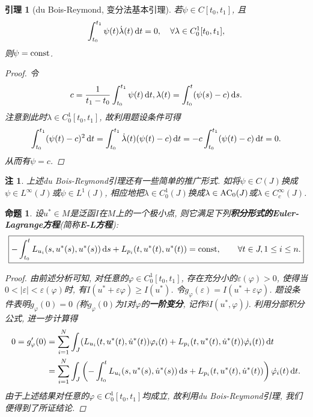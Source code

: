 \documentclass[12pt,a4paper]{article}
\newtheorem{proposition}[theorem]{命题}
\newtheorem{lemma}[theorem]{引理}
\newtheorem{remark}[theorem]{注}
\begin{document}
\begin{lemma}[du Bois-Reymond, 变分法基本引理]
    若$\psi \in C[t_0, t_1]$, 且
    \begin{equation*}
        \int_{t_0}^{t_1} \psi(t)\dot{\lambda}(t) \,{\rm d}t = 0, \quad \forall \lambda \in C_0^1[t_0, t_1],
    \end{equation*}
    则$\psi = {\rm const}$.
    \begin{proof}
        令
        \begin{equation*}
            c = \frac{1}{t_1 - t_0}\int_{t_0}^{t_1}\psi(t) \,{\rm d}t, \lambda(t) = \int_{t_0}^t(\psi(s) - c) \,{\rm d}s.
        \end{equation*}
        注意到此时$\lambda \in C_0^1[t_0, t_1]$, 故利用题设条件可得 
        \begin{equation*}
            \int_{t_0}^{t_1}(\psi(t) - c)^2 \,{\rm d}t = \int_{t_0}^{t_1}\dot{\lambda}(t)(\psi(t) - c) \,{\rm d}t = -c\int_{t_0}^{t_1}(\psi(t) - c) \,{\rm d}t = 0.
        \end{equation*}
        从而有$\psi = c$.
    \end{proof}
\end{lemma}

\begin{remark}
    上述du Bois-Reymond引理还有一些简单的推广形式. 如将$\psi \in C(J)$换成$\psi \in L^{\infty}(J)$或$\psi \in L^1(J)$, 相应地把$\lambda \in C_0^1(J)$换成$\lambda \in {\rm AC_0}(J)$或$\lambda \in C_c^{\infty}(J)$.
\end{remark}

\begin{proposition}
    设$u^* \in M$是泛函$I$在$M$上的一个极小点, 则它满足下列\textbf{积分形式的Euler-Lagrange方程}(简称\textbf{E-L方程}):
    \begin{equation*}
        \boxed{-\int_{t_0}^tL_{u_i}(s, u^*(s) , u^*(s)) \,{\rm d}s + L_{p_i}(t, u^*(t) , u^*(t)) = {\rm const}, \qquad \forall t \in J, 1 \leq i \leq n.}
    \end{equation*}
    \begin{proof}
        由前述分析可知, 对任意的$\varphi \in C_0^1[t_0, t_1]$, 存在充分小的$\varepsilon(\varphi) > 0$, 使得当$0 < |\varepsilon| < \varepsilon(\varphi)$时, 有$I(u^* + \varepsilon\varphi) \geq I(u^*)$.
        令$g_{\varphi}(\varepsilon) = I(u^* + \varepsilon\varphi)$. 题设条件表明$\dot g_{\varphi}(0) = 0$ (称$\dot g_{\varphi}(0)$为$I$对$\varphi$的\textbf{一阶变分}, 记作$\delta I(u^*, \varphi)$).
        利用分部积分公式, 进一步计算得
        \begin{align*}
            0 = g_{\varphi}'(0) &= \sum\limits_{i = 1}^N\int_J(L_{u_i}(t, u^*(t) , \dot u^*(t))\varphi_i(t) + L_{p_i}(t, u^*(t) , \dot u^*(t))\dot{\varphi_i}(t)) \,{\rm d}t \\  
            &= \sum\limits_{i = 1}^N\int_J\left(-\int_{t_0}^tL_{u_i}(s, u^*(s) , \dot u^*(s)) \,{\rm d}s + L_{p_i}(t, u^*(t) , \dot u^*(t))\right)\dot{\varphi_i}(t) \,{\rm d}t.
        \end{align*}
        由于上述结果对任意的$\varphi \in C_0^1[t_0, t_1]$均成立, 故利用du Bois-Reymond引理, 我们便得到了所证结论.
    \end{proof}
\end{proposition}
\end{document}
